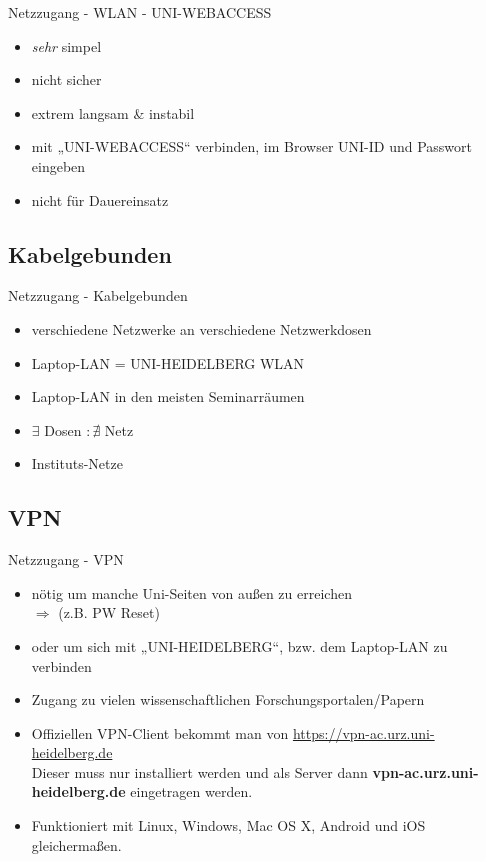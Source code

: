 \begin{frame}{Netzzugang - WLAN - UNI-WEBACCESS}
    \begin{itemize}
        \item \textit{sehr} simpel
        \item nicht sicher
        \item extrem langsam \& instabil
        \item mit „UNI-WEBACCESS“ verbinden, im Browser UNI-ID und Passwort eingeben
        \item nicht für Dauereinsatz
    \end{itemize}
\end{frame}

\subsection{Kabelgebunden}
\begin{frame}{Netzzugang - Kabelgebunden}
    \begin{itemize}
        \item verschiedene Netzwerke an verschiedene Netzwerkdosen
        \item Laptop-LAN = UNI-HEIDELBERG WLAN
        \item Laptop-LAN in den meisten Seminarräumen
        \item $\exists$ Dosen $\colon \nexists$ Netz
        \item Instituts-Netze
    \end{itemize}
\end{frame}

\subsection{VPN}
\begin{frame}{Netzzugang - VPN}
    \begin{itemize}
        \item nötig um manche Uni-Seiten von außen zu erreichen \\ $\Rightarrow$ (z.B. PW Reset)
        \item oder um sich mit „UNI-HEIDELBERG“, bzw. dem Laptop-LAN zu verbinden\pause
        \item Zugang zu vielen wissenschaftlichen Forschungsportalen/Papern
        \item Offiziellen VPN-Client bekommt man von {\url{https://vpn-ac.urz.uni-heidelberg.de}}\\
            Dieser muss nur installiert werden und als Server dann
            \textbf{vpn-ac.urz.uni-heidelberg.de} eingetragen werden.
        \item Funktioniert mit Linux, Windows, Mac OS X, Android und iOS gleichermaßen.
    \end{itemize}
\end{frame}

